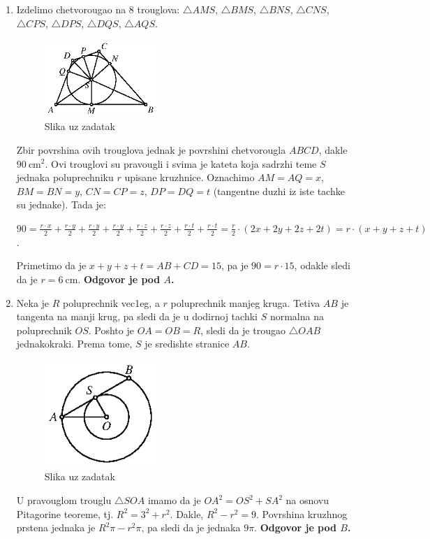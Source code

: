 \documentclass[a4paper,12pt]{article}
\begin{document}
\begin{enumerate}[1.]
\item Izdelimo chetvorougao na 8 trouglova: $\triangle AMS$, $\triangle BMS$, $\triangle BNS$, $\triangle CNS$, $\triangle CPS$, $\triangle DPS$, $\triangle DQS$, $\triangle AQS$.
\begin{figure}[h!]
\begin{center}
\includegraphics[width=0.4\textwidth]{sl8.eps}
\caption{Slika uz zadatak}
\end{center}
\end{figure}
Zbir povrshina ovih trouglova jednak je povrshini chetvorougla $ABCD$, dakle $90\mathrm{\ cm}^2$. Ovi trouglovi su pravougli i svima je kateta koja sadrzhi teme $S$ jednaka poluprechniku $r$ upisane kruzhnice. Oznachimo $AM=AQ=x$, $BM=BN=y$, $CN=CP=z$, $DP=DQ=t$ (tangentne duzhi iz iste tachke su jednake). Tada je:
\par $90=\frac{r \cdot x}{2}+\frac{r \cdot y}{2}+\frac{r \cdot y}{2}+\frac{r \cdot y}{2}+\frac{r \cdot z}{2}+\frac{r \cdot z}{2}+\frac{r \cdot t}{2}+\frac{r \cdot t}{2}=\frac{r}{2}\cdot(2x+2y+2z+2t)=r\cdot(x+y+z+t)$.
\par Primetimo da je $x+y+z+t=AB+CD=15$, pa je $90=r\cdot 15$, odakle sledi da je $r=6\mathrm{\ cm}$. \textbf{Odgovor je pod $A$.}

\item Neka je $R$ poluprechnik vec1eg, a $r$ poluprechnik manjeg kruga. Tetiva $AB$ je tangenta na manji krug, pa sledi da je u dodirnoj tachki $S$ normalna na poluprechnik $OS$. Poshto je $OA=OB=R$, sledi da je trougao $\triangle OAB$ jednakokraki. Prema tome, $S$ je sredishte stranice $AB$.
\begin{figure}[h!]
\begin{center}
\includegraphics[width=0.4\textwidth]{sl7.eps}
\caption{Slika uz zadatak}
\end{center}
\end{figure}
U pravouglom trouglu $\triangle SOA$ imamo da je $OA^2=OS^2+SA^2$ na osnovu Pitagorine teoreme, tj. $R^2=3^2+r^2$. Dakle, $R^2-r^2=9$. Povrshina kruzhnog prstena jednaka je $R^2\pi-r^2\pi$, pa sledi da je jednaka $9\pi$. \textbf{Odgovor je pod $B$.}


\end{enumerate}
\end{document}
